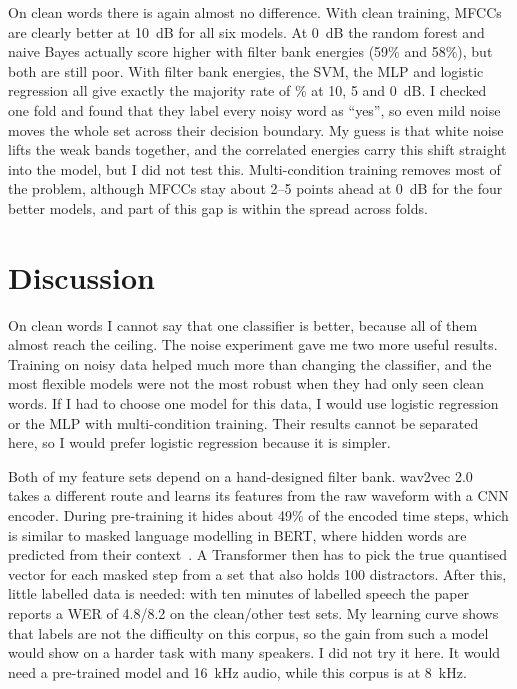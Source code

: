 \documentclass[11pt,a4paper]{article}
\begin{document}
On clean words there is again almost no difference. With clean training, MFCCs are clearly better at 10~dB for all six models. At 0~dB the random forest and naive Bayes actually score higher with filter bank energies (59\% and 58\%), but both are still poor. With filter bank energies, the SVM, the MLP and logistic regression all give exactly the majority rate of \Major\% at 10, 5 and 0~dB. I checked one fold and found that they label every noisy word as ``yes'', so even mild noise moves the whole set across their decision boundary. My guess is that white noise lifts the weak bands together, and the correlated energies carry this shift straight into the model, but I did not test this. Multi-condition training removes most of the problem, although MFCCs stay about 2--5 points ahead at 0~dB for the four better models, and part of this gap is within the spread across folds.

\section{Discussion}
On clean words I cannot say that one classifier is better, because all of them almost reach the ceiling. The noise experiment gave me two more useful results. Training on noisy data helped much more than changing the classifier, and the most flexible models were not the most robust when they had only seen clean words. If I had to choose one model for this data, I would use logistic regression or the MLP with multi-condition training. Their results cannot be separated here, so I would prefer logistic regression because it is simpler.

Both of my feature sets depend on a hand-designed filter bank. wav2vec 2.0~\cite{wav2vec} takes a different route and learns its features from the raw waveform with a CNN encoder. During pre-training it hides about 49\% of the encoded time steps, which is similar to masked language modelling in BERT, where hidden words are predicted from their context~\cite{mlm}. A Transformer then has to pick the true quantised vector for each masked step from a set that also holds 100 distractors. After this, little labelled data is needed: with ten minutes of labelled speech the paper reports a WER of 4.8/8.2 on the clean/other test sets. My learning curve shows that labels are not the difficulty on this corpus, so the gain from such a model would show on a harder task with many speakers. I did not try it here. It would need a pre-trained model and 16~kHz audio, while this corpus is at 8~kHz.
\end{document}
